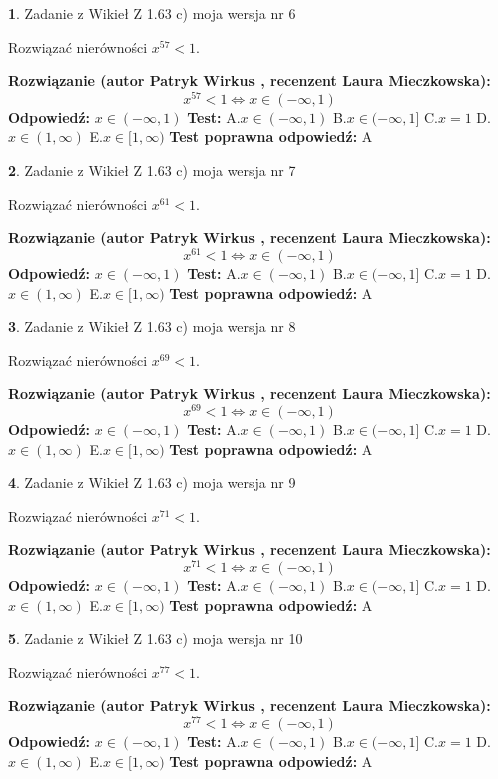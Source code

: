 \documentclass[12pt, a4paper]{article}
\theoremstyle{definition} %
\newtheorem{zad}{}
\newcommand{\zadStart}[1]{\begin{zad}#1\newline}
\newcommand{\zadStop}{\end{zad}}
\newcommand{\rozwStart}[2]{\noindent \textbf{Rozwiązanie (autor #1 , recenzent #2): }\newline}
\newcommand{\rozwStop}{\newline}
\newcommand{\odpStart}{\noindent \textbf{Odpowiedź:}\newline}
\newcommand{\odpStop}{\newline}
\newcommand{\testStart}{\noindent \textbf{Test:}\newline}
\newcommand{\testStop}{\newline}
\newcommand{\kluczStart}{\noindent \textbf{Test poprawna odpowiedź:}\newline}
\newcommand{\kluczStop}{\newline}
\begin{document}
\zadStart{Zadanie z Wikieł Z 1.63 c) moja wersja nr 6}

Rozwiązać nierówności $x^{57} < 1$.
\zadStop
\rozwStart{Patryk Wirkus}{Laura Mieczkowska}
$$x^{57} < 1 \iff x \in (-\infty,1)$$
\rozwStop
\odpStart
$x \in (-\infty,1)$
\odpStop
\testStart
A.$x \in (-\infty,1)$ B.$x \in (-\infty,1]$ C.$x = 1$ D.$x \in (1,\infty)$ E.$x \in [1,\infty)$
\testStop
\kluczStart
A
\kluczStop



\zadStart{Zadanie z Wikieł Z 1.63 c) moja wersja nr 7}

Rozwiązać nierówności $x^{61} < 1$.
\zadStop
\rozwStart{Patryk Wirkus}{Laura Mieczkowska}
$$x^{61} < 1 \iff x \in (-\infty,1)$$
\rozwStop
\odpStart
$x \in (-\infty,1)$
\odpStop
\testStart
A.$x \in (-\infty,1)$ B.$x \in (-\infty,1]$ C.$x = 1$ D.$x \in (1,\infty)$ E.$x \in [1,\infty)$
\testStop
\kluczStart
A
\kluczStop



\zadStart{Zadanie z Wikieł Z 1.63 c) moja wersja nr 8}

Rozwiązać nierówności $x^{69} < 1$.
\zadStop
\rozwStart{Patryk Wirkus}{Laura Mieczkowska}
$$x^{69} < 1 \iff x \in (-\infty,1)$$
\rozwStop
\odpStart
$x \in (-\infty,1)$
\odpStop
\testStart
A.$x \in (-\infty,1)$ B.$x \in (-\infty,1]$ C.$x = 1$ D.$x \in (1,\infty)$ E.$x \in [1,\infty)$
\testStop
\kluczStart
A
\kluczStop



\zadStart{Zadanie z Wikieł Z 1.63 c) moja wersja nr 9}

Rozwiązać nierówności $x^{71} < 1$.
\zadStop
\rozwStart{Patryk Wirkus}{Laura Mieczkowska}
$$x^{71} < 1 \iff x \in (-\infty,1)$$
\rozwStop
\odpStart
$x \in (-\infty,1)$
\odpStop
\testStart
A.$x \in (-\infty,1)$ B.$x \in (-\infty,1]$ C.$x = 1$ D.$x \in (1,\infty)$ E.$x \in [1,\infty)$
\testStop
\kluczStart
A
\kluczStop



\zadStart{Zadanie z Wikieł Z 1.63 c) moja wersja nr 10}

Rozwiązać nierówności $x^{77} < 1$.
\zadStop
\rozwStart{Patryk Wirkus}{Laura Mieczkowska}
$$x^{77} < 1 \iff x \in (-\infty,1)$$
\rozwStop
\odpStart
$x \in (-\infty,1)$
\odpStop
\testStart
A.$x \in (-\infty,1)$ B.$x \in (-\infty,1]$ C.$x = 1$ D.$x \in (1,\infty)$ E.$x \in [1,\infty)$
\testStop
\kluczStart
A
\kluczStop
\end{document}
